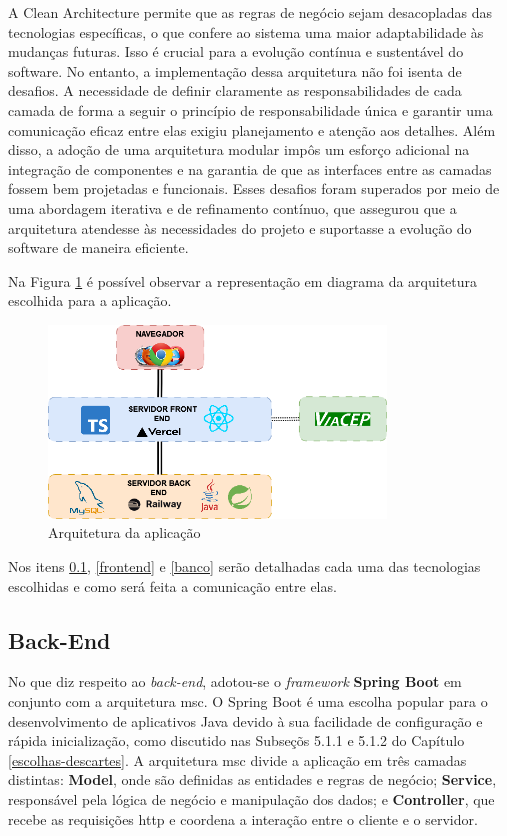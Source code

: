 A Clean Architecture permite que as regras de negócio sejam desacopladas das tecnologias específicas, o que confere ao sistema uma maior adaptabilidade às mudanças futuras. Isso é crucial para a evolução contínua e sustentável do software. No entanto, a implementação dessa arquitetura não foi isenta de desafios. A necessidade de definir claramente as responsabilidades de cada camada de forma a seguir o princípio de responsabilidade única e garantir uma comunicação eficaz entre elas exigiu planejamento e atenção aos detalhes. Além disso, a adoção de uma arquitetura modular impôs um esforço adicional na integração de componentes e na garantia de que as interfaces entre as camadas fossem bem projetadas e funcionais. Esses desafios foram superados por meio de uma abordagem iterativa e de refinamento contínuo, que assegurou que a arquitetura atendesse às necessidades do projeto e suportasse a evolução do software de maneira eficiente.


Na Figura \ref{arquitetura} é possível observar a representação em diagrama da arquitetura escolhida para a aplicação. 

\begin{figure}[ht]
        \centering
\includegraphics[width=0.8\textwidth]{images/EstruturaVocco(1).png}
        \caption{Arquitetura da aplicação}
        \label{arquitetura}
    \end{figure}

Nos itens \ref{backend}, \ref{frontend} e \ref{banco} serão detalhadas cada uma das tecnologias escolhidas e como será feita a comunicação entre elas.

\subsection{Back-End}
\label{backend}
No que diz respeito ao \textit{back-end}, adotou-se o \textit{framework} \textbf{Spring Boot} em conjunto com a arquitetura \ac{msc}. O Spring Boot é uma escolha popular para o desenvolvimento de aplicativos Java devido à sua facilidade de configuração e rápida inicialização, como discutido nas Subseçõs 5.1.1 e 5.1.2 do Capítulo \ref{escolhas-descartes}. A arquitetura \ac{msc} divide a aplicação em três camadas distintas: \textbf{Model}, onde são definidas as entidades e regras de negócio; \textbf{Service}, responsável pela lógica de negócio e manipulação dos dados; e \textbf{Controller}, que recebe as requisições \ac{http} e coordena a interação entre o cliente e o servidor. 

